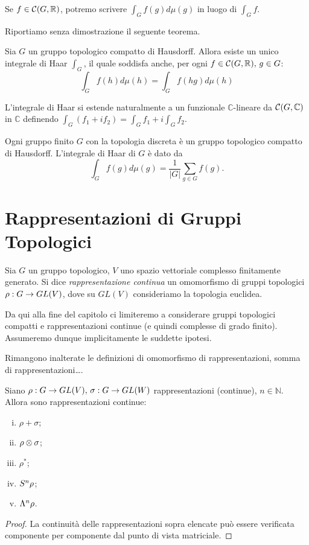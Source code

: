 Se $f\in\mathcal{C}(G,\mathbb{R})$, potremo scrivere $\int_G f(g)d\mu(g)$ in luogo di $\int_G f$.

Riportiamo senza dimostrazione il seguente teorema.
\begin{proposition}[Haar]
Sia $G$ un gruppo topologico compatto di Hausdorff. Allora esiste un unico integrale di Haar $\int_G$, il quale soddisfa anche, per ogni $f\in\mathcal{C}(G,\mathbb{R}),\,\allowbreak g\in G$:
$$
\int_Gf(h)d\mu(h)=\int_Gf(hg)d\mu(h)
$$
\end{proposition}
L'integrale di Haar si estende naturalmente a un funzionale $\mathbb{C}$-lineare da $\mathcal{C}(G,\mathbb{C})$ in $\mathbb{C}$ definendo $\int_G(f_1+if_2)=\int_Gf_1+i\int_Gf_2$.

\begin{example}
Ogni gruppo finito $G$ con la topologia discreta è un gruppo topologico compatto di Hausdorff. L'integrale di Haar di $G$ è dato da
$$
\int_Gf(g)d\mu(g)=\frac{1}{|G|}\sum_{g\in G}f(g).
$$
\end{example}

\section{Rappresentazioni di Gruppi Topologici}
\begin{definition}
Sia $G$ un gruppo topologico, $V$ uno spazio vettoriale complesso finitamente generato. Si dice \emph{rappresentazione continua} un omomorfismo di gruppi topologici $\rho:G\to GL(V)$, dove su $GL(V)$ consideriamo la topologia euclidea.
\end{definition}
Da qui alla fine del capitolo ci limiteremo a considerare gruppi topologici compatti e rappresentazioni continue (e quindi complesse di grado finito). Assumeremo dunque implicitamente le suddette ipotesi.

Rimangono inalterate le definizioni di omomorfismo di rappresentazioni, somma di rappresentazioni\dots.

\begin{proposition}
Siano $\rho:G\to GL(V),\,\allowbreak\sigma:G\to GL(W)$ rappresentazioni (continue), $n\in\mathbb{N}$. Allora sono rappresentazioni continue:
\begin{enumerate}[(i)]
\item $\rho+\sigma$;
\item $\rho\otimes\sigma$;
\item $\rho^*$;
\item $S^n\rho$;
\item $\Lambda^n\rho$.
\end{enumerate}
\end{proposition}
\begin{proof}
La continuità delle rappresentazioni sopra elencate può essere verificata componente per componente dal punto di vista matriciale.
\end{proof}


